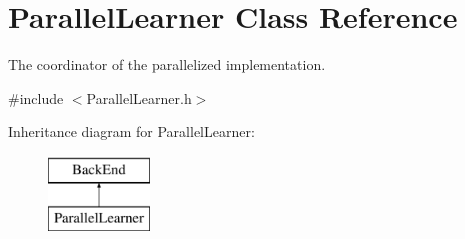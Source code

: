 \hypertarget{classParallelLearner}{\section{Parallel\-Learner Class Reference}
\label{classParallelLearner}
}


The coordinator of the parallelized implementation.  




{\ttfamily \#include $<$Parallel\-Learner.\-h$>$}

Inheritance diagram for Parallel\-Learner\-:\begin{figure}[H]
\begin{center}
\leavevmode
\includegraphics[height=2.000000cm]{classParallelLearner}
\end{center}
\end{figure}
